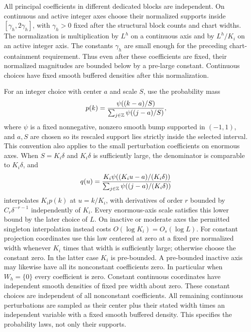 All principal coefficients in different dedicated blocks are independent.
On continuous and active integer axes choose their normalized supports
inside $[\gamma_h,2\gamma_h]$, with $\gamma_h>0$
fixed after the structural block counts and chart widths.  The normalization
is multiplication by $L^h$ on a continuous axis and by $L^h/K_i$
on an active integer axis.  The constants $\gamma_h$ are small enough for the
preceding chart-containment requirement.  Thus even after these
coefficients are fixed, their normalized magnitudes are bounded below
by a pre-large constant.  Continuous choices have fixed smooth
buffered densities after this normalization.

For an integer choice with center $a$ and scale $S$, use the probability
mass
\[
 p(k)=\frac{\psi((k-a)/S)}{\sum_{j\in\mathbb Z}\psi((j-a)/S)},
\]
where $\psi$ is a fixed nonnegative, nonzero smooth bump supported in
$(-1,1)$, and $a,S$ are chosen so its rescaled support lies strictly inside
the selected interval.  This convention also applies to the small
perturbation coefficients on enormous axes.  When $S=K_i\delta$ and
$K_i\delta$ is sufficiently large, the denominator is comparable to
$K_i\delta$, and
\[
 q(u)=\frac{K_i\psi((K_i u-a)/(K_i\delta))}
                 {\sum_{j\in\mathbb Z}\psi((j-a)/(K_i\delta))}
\]
interpolates $K_i p(k)$ at $u=k/K_i$, with derivatives of order $r$
bounded by $C_r\delta^{-r-1}$ independently of $K_i$.
Every enormous-axis scale satisfies this lower bound by the later
choice of $L$.  On inactive or moderate axes the permitted
singleton interpolation instead costs $O(\log K_i)=O_s(\log L)$.
For constant projection coordinates use this law centered at zero at a
fixed pre normalized width whenever $K_i$ times that width is sufficiently
large; otherwise choose the constant zero.  In the latter case $K_i$ is
pre-bounded.  A pre-bounded inactive axis may likewise have all its
nonconstant coefficients zero.  In particular when $W_h=\{0\}$ every
coefficient is zero.  Constant continuous coordinates have independent
smooth densities of fixed pre width about zero.  These constant choices
are independent of all nonconstant coefficients.
All remaining continuous perturbations are sampled as their center
plus their stated width times an independent variable with a fixed
smooth buffered density.  This specifies the probability laws, not
only their supports.

